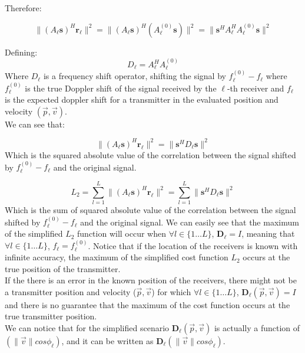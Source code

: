 Therefore:

\begin{equation}
\|(A_\ell\mathbf{s})^H\mathbf{r_\ell}\|^2=\|(A_\ell\mathbf{s})^H(A^{(0)}_\ell \mathbf{s})\|^2=\|\mathbf{s}^H A_\ell^H A^{(0)}_\ell \mathbf{s}\|^2
\end{equation}

Defining:
\begin{equation}
D_\ell = A_\ell^H A^{(0)}_\ell
\end{equation}
Where $D_\ell$ is a frequency shift operator, shifting the signal by $f^{(0)}_\ell-f_\ell$ where $f^{(0)}_\ell$ is
the true Doppler shift of the signal received by the $\ell$-th receiver and $f_\ell$ is the expected doppler shift for a transmitter in the evaluated position and velocity $(\vec{p},\vec{v})$.\\
We can see that:

\begin{equation}
\|(A_\ell\mathbf{s})^H\mathbf{r_\ell}\|^2 = \|\mathbf{s}^H D_\ell \mathbf{s}\|^2
\end{equation}
Which is the squared absolute value of the correlation between the signal shifted by $f^{(0)}_\ell-f_\ell$ and the original signal.


\begin{equation}
L_2 = \sum_{l=1}^L \|(A_\ell\mathbf{s})^H\mathbf{r_\ell}\|^2 = \sum_{l=1}^L \|\mathbf{s}^H D_\ell \mathbf{s}\|^2
\end{equation}
Which is the sum of squared absolute value of the correlation between the signal shifted by $f^{(0)}_\ell-f_\ell$ and the original signal.
We can easily see that the maximum of the simplified $L_2$ function will occur when 
$\forall l \in \{1 \dots L \}$, $\mathbf{D_\ell}=I$, meaning that $\forall l \in \{1 \dots L \}$, 
$f_\ell = f^{(0)}_\ell$.
Notice that if the location of the receivers is known with infinite accuracy, the maximum
of the simplified cost function $L_2$ occurs at the true position of the transmitter.\\
If the there is an error in the known position of the receivers, there might not be a transmitter position and velocity ($\vec{p}, \vec{v}$) for which $\forall l \in\{1\dots L\}$, $\mathbf{D_\ell}(\vec{p},\vec{v}) = I$ and there is no guarantee that the maximum of the cost function occurs at the true transmitter position.
\\
We can notice that for the simplified scenario $\mathbf{D_\ell}(\vec{p},\vec{v})$ is actually a function of
$(\|\vec{v}\|cos\phi_\ell)$, and it can be written as $\mathbf{D_\ell}(\|\vec{v}\|cos\phi_\ell)$.


